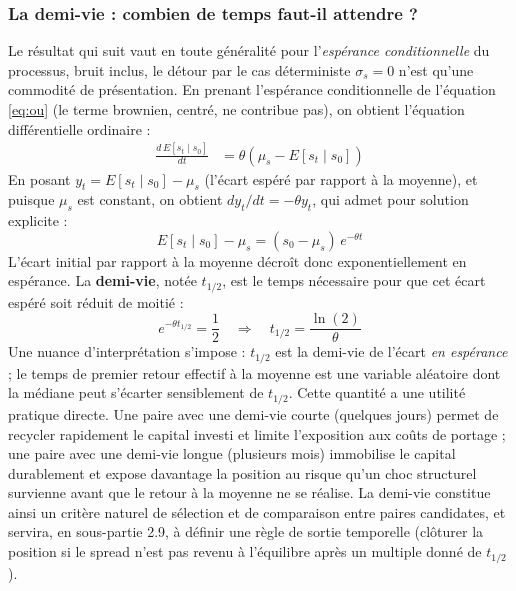 \documentclass{article}
\begin{document}
\subsubsection*{La demi-vie : combien de temps faut-il attendre ?}
Le résultat qui suit vaut en toute généralité pour l'\emph{espérance conditionnelle} du processus, bruit inclus, le détour par le cas déterministe $\sigma_s=0$ n'est qu'une commodité de présentation. En prenant l'espérance conditionnelle de l'équation \eqref{eq:ou} (le terme brownien, centré, ne contribue pas), on obtient l'équation différentielle ordinaire :
\begin{align}
\frac{d\,E[s_t\mid s_0]}{dt} &= \theta(\mu_s - E[s_t\mid s_0])
\end{align}
En posant $y_t = E[s_t\mid s_0] - \mu_s$ (l'écart espéré par rapport à la moyenne), et puisque $\mu_s$ est constant, on obtient $dy_t/dt=-\theta y_t$, qui admet pour solution explicite :
\begin{equation}
E[s_t\mid s_0] - \mu_s = (s_0 - \mu_s)\, e^{-\theta t}
\end{equation}
L'écart initial par rapport à la moyenne décroît donc exponentiellement en espérance. La \textbf{demi-vie}, notée $t_{1/2}$, est le temps nécessaire pour que cet écart espéré soit réduit de moitié :
\begin{equation}
e^{-\theta t_{1/2}} = \frac{1}{2} \quad \Longrightarrow \quad t_{1/2} = \frac{\ln(2)}{\theta}
\end{equation}
Une nuance d'interprétation s'impose : $t_{1/2}$ est la demi-vie de l'écart \emph{en espérance} ; le temps de premier retour effectif à la moyenne est une variable aléatoire dont la médiane peut s'écarter sensiblement de $t_{1/2}$. Cette quantité a une utilité pratique directe. Une paire avec une demi-vie courte (quelques jours) permet de recycler rapidement le capital investi et limite l'exposition aux coûts de portage ; une paire avec une demi-vie longue (plusieurs mois) immobilise le capital durablement et expose davantage la position au risque qu'un choc structurel survienne avant que le retour à la moyenne ne se réalise. La demi-vie constitue ainsi un critère naturel de sélection et de comparaison entre paires candidates, et servira, en sous-partie 2.9, à définir une règle de sortie temporelle (clôturer la position si le spread n'est pas revenu à l'équilibre après un multiple donné de $t_{1/2}$).
\end{document}
